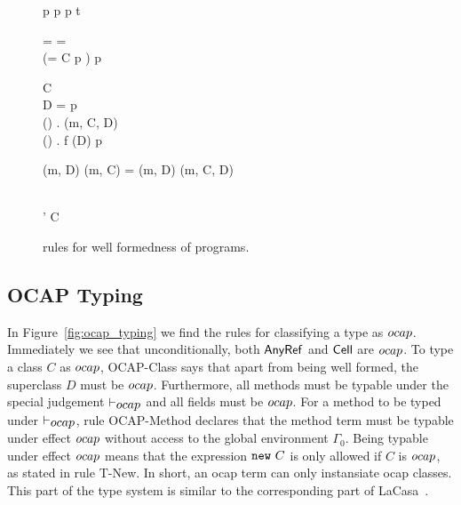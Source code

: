 \begin{figure}[h]
  {p \vdash {} \andalso p \vdash {} \andalso
  }
  {p \vdash {} \:  \: t}

  \RuleSpace{}

  {\sigma = \LatType \lor \sigma = \CellType ~ \lor  \\
  (\sigma = C \land p \vdash {})}
  {p \vdash {}}
  
  \RuleSpace{}

  {C \vdash {} \\ D = \AnyRefType{} \lor
  p \vdash {} \\
  \forall () \in {} . \: \override(m,
  C, D) \\
  \forall () \in {} . \: f \notin \fields(D) }
  {p \vdash {}}

  \RuleSpace{}

  {\mtype(m, D) \lor \mtype(m, C) = \mtype(m, D)}
  {\override(m, C, D)}
  
  \RuleSpace{}

  {  \\
  \tau' \stof \tau}
  {C \vdash {}}
  \caption{\RACL{} rules for well formedness of programs.}
  \label{fig:wf_typing}
\end{figure}

\subsection{OCAP Typing}%
\label{sub:ocap_typing}

In Figure~\ref{fig:ocap_typing} we find the rules for classifying a type as $\mbox{$ocap$}$.
Immediately we see that unconditionally, both $\mbox{$\mathsf{AnyRef}$}$ and $\mbox{$\mathsf{Cell}$}$ are
$\mbox{$ocap$}$. To type a class $C$ as $\mbox{$ocap$}$, {\sc OCAP-Class} says that apart from being
well formed, the superclass $D$ must be $\mbox{$ocap$}$. Furthermore, all methods must
be typable under the special judgement $\vdash_{\mbox{$ocap$}}$ and all fields must be
$\mbox{$ocap$}$.  For a method to be typed under $\vdash_{\mbox{$ocap$}}$, rule {\sc
OCAP-Method} declares that the method term must be typable under effect $\mbox{$ocap$}$
without access to the global environment $\Gamma_0$. Being typable under effect
$\mbox{$ocap$}$ means that the expression $\mbox{\mdseries\texttt{new}~$C$}$ is only allowed if $C$ is $\mbox{$ocap$}$, as
stated in rule {\sc T-New}. In short, an ocap term can only instansiate ocap
classes. This part of the type system is similar to the corresponding part of
LaCasa~\parencite{conf/oopsla/HallerL16}.

